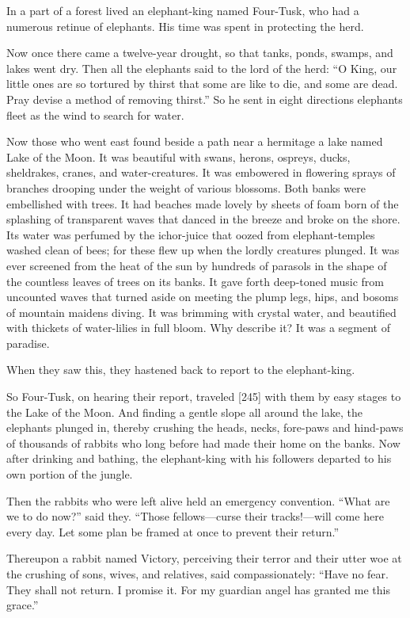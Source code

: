\documentclass[article, twoside, 14pt]{memoir}
\begin{document}
\label{s49}

In a part of a forest lived an elephant-king named Four-Tusk, who
had a numerous retinue of elephants. His time was spent in
protecting the herd.

Now once there came a twelve-year drought, so that tanks, ponds,
swamps, and lakes went dry. Then all the elephants said to the lord
of the herd:
``O King, our little ones are so tortured by thirst that some are like to die, and some are dead. Pray devise a method of removing thirst.''
So he sent in eight directions elephants fleet as the wind to
search for water.

Now those who went east found beside a path near a hermitage a lake
named Lake of the Moon. It was beautiful with swans, herons,
ospreys, ducks, sheldrakes, cranes, and water-creatures. It was
embowered in flowering sprays of branches drooping under the weight
of various blossoms. Both banks were embellished with trees. It had
beaches made lovely by sheets of foam born of the splashing of
transparent waves that danced in the breeze and broke on the shore.
Its water was perfumed by the ichor-juice that oozed from
elephant-temples washed clean of bees; for these flew up when the
lordly creatures plunged. It was ever screened from the heat of the
sun by hundreds of parasols in the shape of the countless leaves of
trees on its banks. It gave forth deep-toned music from uncounted
waves that turned aside on meeting the plump legs, hips, and bosoms
of mountain maidens diving. It was brimming with crystal water, and
beautified with thickets of water-lilies in full bloom. Why
describe it? It was a segment of paradise.

When they saw this, they hastened back to report to the
elephant-king.

So Four-Tusk, on hearing their report, traveled [245] with them by
easy stages to the Lake of the Moon. And finding a gentle slope all
around the lake, the elephants plunged in, thereby crushing the
heads, necks, fore-paws and hind-paws of thousands of rabbits who
long before had made their home on the banks. Now after drinking
and bathing, the elephant-king with his followers departed to his
own portion of the jungle.

Then the rabbits who were left alive held an emergency convention.
``What are we to do now?'' said they.
``Those fellows---curse their tracks!---will come here every day. Let some plan be framed at once to prevent their return.''

Thereupon a rabbit named Victory, perceiving their terror and their
utter woe at the crushing of sons, wives, and relatives, said
compassionately:
``Have no fear. They shall not return. I promise it. For my guardian angel has granted me this grace.''
\end{document}
